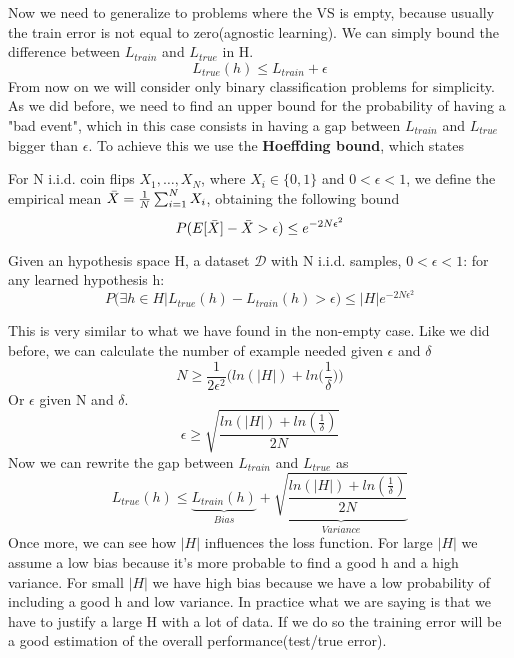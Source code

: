 \documentclass[main.tex]{subfiles}
\begin{document}
Now we need to generalize to problems where the VS is empty, because usually the train error is not equal to zero(agnostic learning). We can simply bound the difference between $L_{train}$ and $L_{true}$ in H.
\begin{equation*}
    L_{true}(h) \leq L_{train} + \epsilon
\end{equation*}
From now on we will consider only binary classification problems for simplicity. As we did before, we need to find an upper bound for the probability of having a "bad event", which in this case consists in having a gap between $L_{train}$ and $L_{true}$ bigger than $\epsilon$. To achieve this we use the \textbf{Hoeffding bound}, which states 
\begin{definition}
For N i.i.d. coin flips $X_1, \dots, X_N$, where $X_i \in \{0,1\}$ and $0 < \epsilon < 1$, we define the empirical mean $\Bar{X}=\frac{1}{N}\sum_{i=1}^N X_i$, obtaining the following bound
\begin{equation*}
    P(E[\Bar{X}]-\Bar{X} > \epsilon) \leq e^{-2N\epsilon^2}
\end{equation*}
\end{definition}
\begin{theorem}
Given an hypothesis space H, a dataset $\mathcal{D}$ with N i.i.d. samples, $0< \epsilon <1$: for any learned hypothesis h:
\begin{equation*}
    P(\exists h \in H | L_{true}(h)-L_{train}(h) > \epsilon) \leq |H|e^{-2N \epsilon^2}
\end{equation*}
\end{theorem}
This is very similar to what we have found in the non-empty case. Like we did before, we can calculate the number of example needed given $\epsilon$ and $\delta$ 
\begin{equation*}
    N \geq \frac{1}{2 \epsilon^2} \bigg( ln(|H|) + ln\bigg( \frac{1}{\delta} \bigg) \bigg)
\end{equation*}
Or $\epsilon$ given N and $\delta$.
\begin{equation*}
    \epsilon \geq \sqrt{\frac{ln(|H|) + ln( \frac{1}{\delta} )}{2N}}
\end{equation*}
Now we can rewrite the gap between $L_{train}$ and $L_{true}$ as
\begin{equation}
    L_{true}(h) \leq \underbrace{L_{train}(h)}_{Bias} + \underbrace{\sqrt{\frac{ln(|H|) + ln( \frac{1}{\delta} )}{2N}}}_{Variance}
\end{equation}
Once more, we can see how $|H|$ influences the loss function. For large $|H|$ we assume a low bias because it's more probable to find a good h and a high variance. For small $|H|$ we have high bias because we have a low probability of including a good h and low variance. In practice what we are saying is that we have to justify a large H with a lot of data. If we do so the training error will be a good estimation of the overall performance(test/true error).
\end{document}
